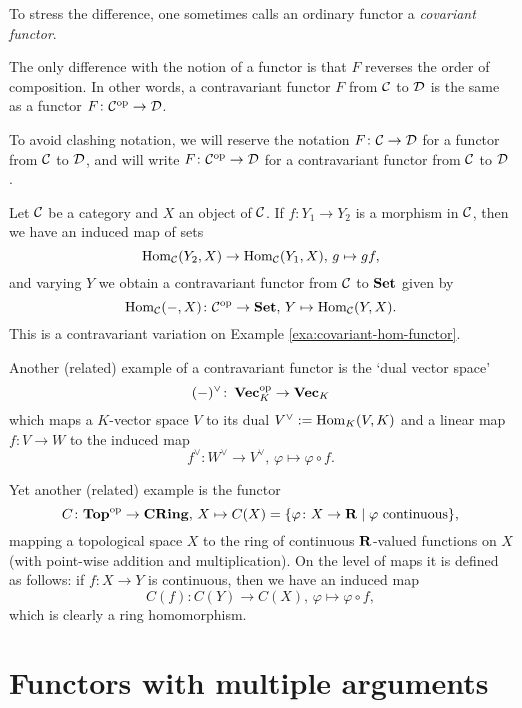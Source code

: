 To stress the difference, one sometimes calls an ordinary functor a \emph{covariant functor}.


\begin{remark}
The only difference with the notion of a functor is that $F$ reverses the order of composition. In other words, a contravariant functor $F$ from ${\mathcal{C}}$ to ${\mathcal{D}}$ is the same as a functor $F\colon {\mathcal{C}}^{\mathrm{op}} \to {\mathcal{D}}$. 

To avoid clashing notation, we will reserve the notation $F\colon {\mathcal{C}} \to {\mathcal{D}}$ for a functor from ${\mathcal{C}}$ to ${\mathcal{D}}$, and will write $F\colon {\mathcal{C}}^{\mathrm{op}} \to {\mathcal{D}}$ for a contravariant functor from ${\mathcal{C}}$ to ${\mathcal{D}}$.
\end{remark}

\begin{example}\label{exa:contravariant-hom-functor}
Let ${\mathcal{C}}$ be a category and $X$ an object of ${\mathcal{C}}$. If $f\colon Y_1\to Y_2$ is a morphism in ${\mathcal{C}}$, then we have an induced map of 
sets
\[
	\operatorname{Hom}_{\mathcal{C}}(Y_2,X) \to \operatorname{Hom}_{\mathcal{C}}(Y_1,X),\, g \mapsto gf,
\]
and varying $Y$ we obtain a contravariant functor from ${\mathcal{C}}$ to $\mathbf{Set}$ given by
\[
	\operatorname{Hom}_{\mathcal{C}}(-,X)\colon {\mathcal{C}}^{\mathrm{op}} \to \mathbf{Set},\,Y \mapsto \operatorname{Hom}_{\mathcal{C}}(Y,X).
\]
This is a contravariant variation on Example \ref{exa:covariant-hom-functor}.
\end{example}

\begin{example}
Another (related) example of a contravariant functor is the `dual vector space'
\[
	(-)^\vee\colon \operatorname{{\bf{Vec}}}_K^{\mathrm{op}} \to \operatorname{{\bf{Vec}}}_K
\]
which maps a $K$-vector space $V$ to its dual $V^{\vee} := \operatorname{Hom}_K(V,K)$ and a linear map
$f\colon V\to W$ to the induced map
\[
	f^\vee\colon W^\vee \to V^\vee,\,
	\varphi \mapsto \varphi\circ f.
\]
\end{example}

\begin{example}\label{exa:functions-on-a-space}
Yet another (related) example is the functor
\[
	C\colon \mathbf{Top}^{\mathrm{op}} \to \mathbf{CRing},\, X \mapsto C(X) = \{ \varphi\colon X\to {\mathbf{R}} \mid \text{$\varphi$ continuous} \},
\]
mapping a topological space $X$ to the ring of continuous ${\mathbf{R}}$-valued functions on $X$ (with point-wise addition and multiplication). On the level of maps it is defined as follows: if $f\colon X\to Y$ is continuous, then we have an induced map
\[
	C(f) \colon C(Y) \to C(X),\, \varphi \mapsto \varphi\circ f,
\]
which is clearly a ring homomorphism. 
\end{example}

\section{Functors with multiple arguments}


